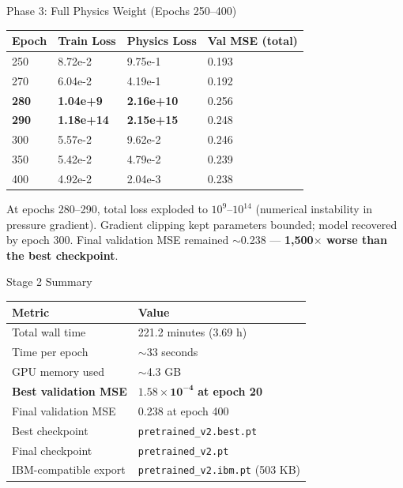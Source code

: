 \documentclass[aspectratio=169]{beamer}
\begin{document}
\begin{frame}{Phase 3: Full Physics Weight (Epochs 250--400)}
\begin{table}
\centering
\small
\begin{tabular}{llll}
\toprule
Epoch & Train Loss & Physics Loss & Val MSE (total) \\
\midrule
250 & 8.72e-2 & 9.75e-1 & 0.193 \\
270 & 6.04e-2 & 4.19e-1 & 0.192 \\
\textbf{280} & \textbf{1.04e+9} & \textbf{2.16e+10} & 0.256 \\
\textbf{290} & \textbf{1.18e+14} & \textbf{2.15e+15} & 0.248 \\
300 & 5.57e-2 & 9.62e-2 & 0.246 \\
350 & 5.42e-2 & 4.79e-2 & 0.239 \\
400 & 4.92e-2 & 2.04e-3 & 0.238 \\
\bottomrule
\end{tabular}
\end{table}

At epochs 280--290, total loss exploded to $10^9$--$10^{14}$ (numerical instability in pressure gradient). Gradient clipping kept parameters bounded; model recovered by epoch 300. Final validation MSE remained $\sim$0.238 --- \textbf{1,500$\times$ worse than the best checkpoint}.
\end{frame}

\begin{frame}{Stage 2 Summary}
\begin{table}
\centering
\begin{tabular}{ll}
\toprule
Metric & Value \\
\midrule
Total wall time & 221.2 minutes (3.69 h) \\
Time per epoch & $\sim$33 seconds \\
GPU memory used & $\sim$4.3 GB \\
\textbf{Best validation MSE} & $\mathbf{1.58\times10^{-4}}$ \textbf{at epoch 20} \\
Final validation MSE & 0.238 at epoch 400 \\
Best checkpoint & \texttt{pretrained\_v2.best.pt} \\
Final checkpoint & \texttt{pretrained\_v2.pt} \\
IBM-compatible export & \texttt{pretrained\_v2.ibm.pt} (503 KB) \\
\bottomrule
\end{tabular}
\end{table}
\end{frame}
\end{document}
